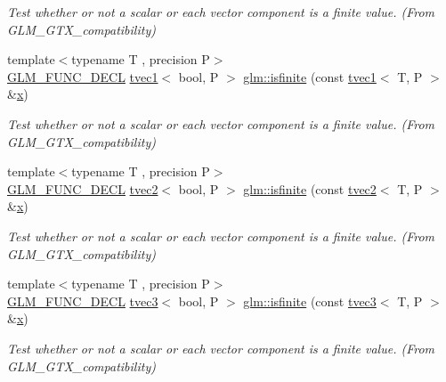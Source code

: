 \begin{DoxyCompactItemize}
\begin{DoxyCompactList}\small\item\em Test whether or not a scalar or each vector component is a finite value. (From G\+L\+M\+\_\+\+G\+T\+X\+\_\+compatibility) \end{DoxyCompactList}\item 
{\footnotesize template$<$typename T , precision P$>$ }\\\mbox{\hyperlink{setup_8hpp_ab2d052de21a70539923e9bcbf6e83a51}{G\+L\+M\+\_\+\+F\+U\+N\+C\+\_\+\+D\+E\+CL}} \mbox{\hyperlink{structglm_1_1tvec1}{tvec1}}$<$ bool, P $>$ \mbox{\hyperlink{group__gtx__compatibility_ga553e2e95b06a0f70c718605998889d3b}{glm\+::isfinite}} (const \mbox{\hyperlink{structglm_1_1tvec1}{tvec1}}$<$ T, P $>$ \&\mbox{\hyperlink{glad_8h_a92d0386e5c19fb81ea88c9f99644ab1d}{x}})
\begin{DoxyCompactList}\small\item\em Test whether or not a scalar or each vector component is a finite value. (From G\+L\+M\+\_\+\+G\+T\+X\+\_\+compatibility) \end{DoxyCompactList}\item 
{\footnotesize template$<$typename T , precision P$>$ }\\\mbox{\hyperlink{setup_8hpp_ab2d052de21a70539923e9bcbf6e83a51}{G\+L\+M\+\_\+\+F\+U\+N\+C\+\_\+\+D\+E\+CL}} \mbox{\hyperlink{structglm_1_1tvec2}{tvec2}}$<$ bool, P $>$ \mbox{\hyperlink{group__gtx__compatibility_ga7dd492aa7d6ec21715f9a91b6e5e596a}{glm\+::isfinite}} (const \mbox{\hyperlink{structglm_1_1tvec2}{tvec2}}$<$ T, P $>$ \&\mbox{\hyperlink{glad_8h_a92d0386e5c19fb81ea88c9f99644ab1d}{x}})
\begin{DoxyCompactList}\small\item\em Test whether or not a scalar or each vector component is a finite value. (From G\+L\+M\+\_\+\+G\+T\+X\+\_\+compatibility) \end{DoxyCompactList}\item 
{\footnotesize template$<$typename T , precision P$>$ }\\\mbox{\hyperlink{setup_8hpp_ab2d052de21a70539923e9bcbf6e83a51}{G\+L\+M\+\_\+\+F\+U\+N\+C\+\_\+\+D\+E\+CL}} \mbox{\hyperlink{structglm_1_1tvec3}{tvec3}}$<$ bool, P $>$ \mbox{\hyperlink{group__gtx__compatibility_ga1be9593d810fceb278a2854da8a25273}{glm\+::isfinite}} (const \mbox{\hyperlink{structglm_1_1tvec3}{tvec3}}$<$ T, P $>$ \&\mbox{\hyperlink{glad_8h_a92d0386e5c19fb81ea88c9f99644ab1d}{x}})
\begin{DoxyCompactList}\small\item\em Test whether or not a scalar or each vector component is a finite value. (From G\+L\+M\+\_\+\+G\+T\+X\+\_\+compatibility) \end{DoxyCompactList}\item 

\end{DoxyCompactItemize}

